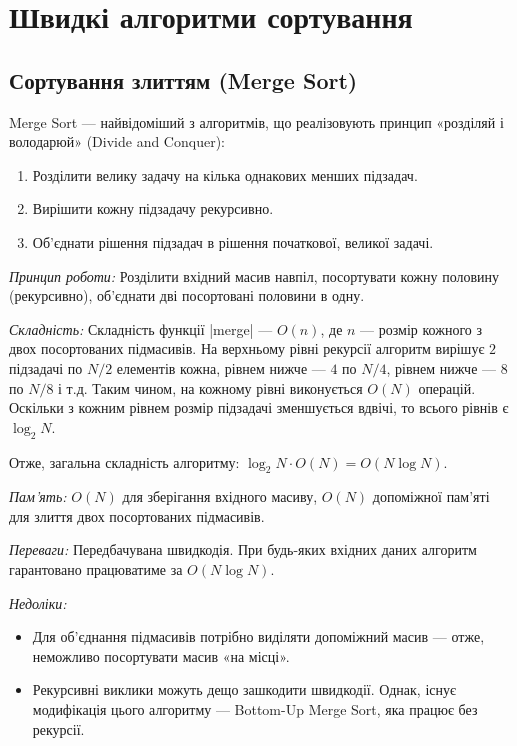 \documentclass[12pt,a4paper]{report}
\begin{document}
\pagebreak


\section{Швидкі алгоритми сортування}


\subsection{Сортування злиттям (Merge Sort)}

Merge Sort --- найвідоміший з алгоритмів, що реалізовують принцип «розділяй і володарюй» (Divide and Conquer):
\begin{enumerate}
    \item Розділити велику задачу на кілька однакових менших підзадач.
    \item Вирішити кожну підзадачу рекурсивно.
    \item Об’єднати рішення підзадач в рішення початкової, великої задачі.
\end{enumerate}

\emph{Принцип роботи:} Розділити вхідний масив навпіл, посортувати кожну половину (рекурсивно), об’єднати дві посортовані половини в одну.



\emph{Складність:} Складність функції |merge| --- \(O(n)\), де \(n\) --- розмір кожного з двох посортованих підмасивів.
На верхньому рівні рекурсії алгоритм вирішує \(2\) підзадачі по \(N/2\) елементів кожна, рівнем нижче --- \(4\) по \(N/4\), рівнем нижче --- \(8\) по \(N/8\) і т.д.
Таким чином, на кожному рівні виконується \(O(N)\) операцій.
Оскільки з кожним рівнем розмір підзадачі зменшується вдвічі, то всього рівнів є \(\log_2 N\).

Отже, загальна складність алгоритму: \(\log_2 N \cdot O(N) = O(N \log N)\).

\emph{Пам’ять:} \(O(N)\) для зберігання вхідного масиву, \(O(N)\) допоміжної пам’яті для злиття двох посортованих підмасивів.

\emph{Переваги:} Передбачувана швидкодія. При будь-яких вхідних даних алгоритм гарантовано працюватиме за \(O(N \log N)\).

\emph{Недоліки:}
\begin{itemize}
    \item Для об’єднання підмасивів потрібно виділяти допоміжний масив --- отже, неможливо посортувати масив «на місці».
    \item Рекурсивні виклики можуть дещо зашкодити швидкодії. Однак, існує модифікація цього алгоритму --- Bottom-Up Merge Sort, яка працює без рекурсії.
\end{itemize}
\end{document}
